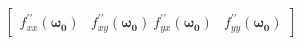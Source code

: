 \documentclass[preview]{standalone}
\begin{document}
\begin{align*}
\begin{bmatrix} f_{xx}^{\prime \prime}(\mathbf{\omega_0}) & f_{xy}^{\prime \prime}(\mathbf{\omega_0})\ f_{yx}^{\prime \prime}(\mathbf{\omega_0}) & f_{yy}^{\prime \prime}(\mathbf{\omega_0})\end{bmatrix}
\end{align*}
\end{document}
